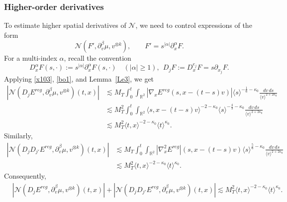 \documentclass[reqno,11pt]{amsart}
\numberwithin{equation}{section}
\begin{document}
	\subsubsection{Higher-order derivatives} To estimate higher spatial derivatives of $\mathcal N$, we need to
	control expressions of the form
	\begin{equation*}
		\mathcal N(F',\partial_v^\beta\mu,v^{\otimes k}),
		\qquad
		F'=s^{|\alpha|}\partial_x^\alpha F.
	\end{equation*}
	For a multi-index $\alpha$, recall the convention
	\begin{equation}\label{sec5eq20}
		D_x^\alpha F(s,\cdot)
		:=s^{|\alpha|}\partial_x^\alpha F(s,\cdot)
		\quad (|\alpha|\geq1),~~
		D_jF:=D_x^{e_j}F=s\partial_{x_j}F.
	\end{equation}
	Applying \eqref{x103}, \eqref{bo1}, and Lemma~\ref{Le3}, we get
	\begin{align*}
		\left|\mathcal N(D_jE^{reg},\partial_v^\beta\mu,v^{\otimes k})(t,x)\right|
		&\lesssim M_T\int_0^t\int_{\mathbb R^2}
		|\nabla_xE^{reg}(s,x-(t-s)v)|
		\langle s\rangle^{-\frac16-\kappa_0}
		\frac{dv\,ds}{\langle v\rangle^{2+2\kappa_0}}\\
		&\lesssim M_T^2
		\int_0^t\int_{\mathbb R^2}
		\langle s,x-(t-s)v\rangle^{-2-\kappa_0}
		\langle s\rangle^{-\frac43-\kappa_0}
		\frac{dv\,ds}{\langle v\rangle^{2+2\kappa_0}}\\
		&\lesssim M_T^2
		\langle t,x\rangle^{-2-\kappa_0}
		\langle t\rangle^{\kappa_0}.
	\end{align*}
	Similarly,
	\begin{align*}
		\left|\mathcal N(D_jD_{j'}E^{reg},\partial_v^\beta\mu,v^{\otimes k})(t,x)\right|
		&\lesssim M_T
		\int_0^t\int_{\mathbb R^2}
		|\nabla_x^2E^{reg}|(s,x-(t-s)v)
		\langle s\rangle^{\frac56-\kappa_0}
		\frac{dv\,ds}{\langle v\rangle^{2+2\kappa_0}}\\
		&\lesssim M_T^2\langle t,x\rangle^{-2-\kappa_0}
		\langle t\rangle^{\kappa_0}.
	\end{align*}
	Consequently,
	\begin{align}
		&\left|
		\mathcal N(D_jE^{reg},\partial_v^\beta\mu,v^{\otimes k})(t,x)
		\right|
		+
		\left|
		\mathcal N(D_jD_{j'}E^{reg},\partial_v^\beta\mu,v^{\otimes k})(t,x)
		\right|\lesssim
		M_T^2
		\langle t,x\rangle^{-2-\kappa_0}
		\langle t\rangle^{\kappa_0}.
		\label{q5}
	\end{align}
	
\end{document}
